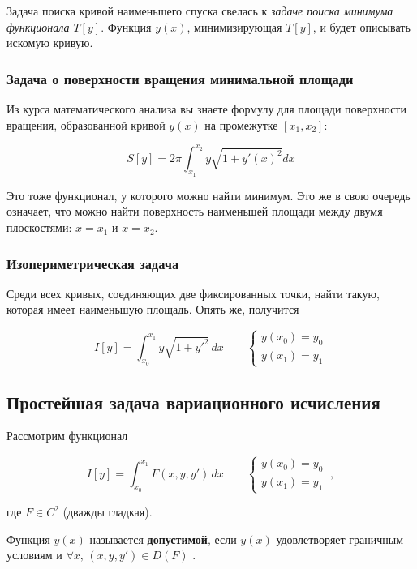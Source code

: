 \documentclass[12pt]{article}
\begin{document}
			Задача поиска кривой наименьшего спуска свелась к \textit{задаче поиска минимума функционала
			$T[y]$}. Функция $y(x)$, минимизирующая $T[y]$, и будет описывать искомую кривую.

		\subsubsection{Задача о поверхности вращения минимальной площади}

			Из курса математического анализа вы знаете формулу для площади поверхности вращения, образованной
			кривой $y(x)$ на промежутке $[x_1, x_2]$:

				$$S[y] = 2 \pi \int_{x_1}^{x_2} y \sqrt{1+y'(x)^2} dx$$

			Это тоже функционал, у которого можно найти минимум. Это же в свою очередь означает, что можно
			найти поверхность наименьшей площади между двумя плоскостями: $x=x_1$ и $x=x_2$.

		\subsubsection{Изопериметрическая задача}

	

			Среди всех кривых, соединяющих две фиксированных точки, найти такую, которая имеет наименьшую
			площадь. Опять же, получится
	
			$$I[y] = \int_{x_0}^{x_1} y\sqrt{1 + y'^2}\,dx \qquad \left\{
			\begin{aligned}
				y(x_0) = y_0 \\
				y(x_1) = y_1
			\end{aligned}
			\right.$$
	
	\subsection{Простейшая задача вариационного исчисления}
	
		Рассмотрим функционал
 
		$$I[y] = \int_{x_0}^{x_1} F(x,y,y') \,dx \qquad \left\{
		\begin{aligned}
			y(x_0) = y_0 \\
			y(x_1) = y_1
		\end{aligned}
		\right. ~ ,$$
	
		где $F\in C^2$ (дважды гладкая).

		\begin{defi}
			Функция $y(x)$ называется \textbf{допустимой}, если $y(x)$ удовлетворяет граничным условиям и
			$\forall x,\, (x, y, y')\in D(F)$ .
		\end{defi}
\end{document}
